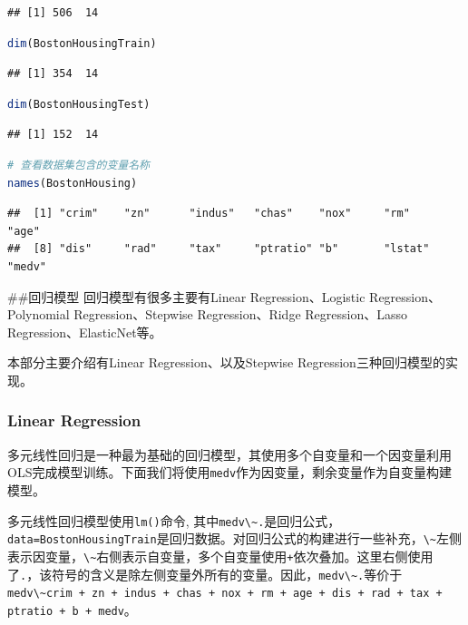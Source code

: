 \documentclass[]{ctexbook}
\newcommand{\passthrough}[1]{#1}
\begin{document}
\begin{lstlisting}
## [1] 506  14
\end{lstlisting}

\begin{lstlisting}[language=R]
dim(BostonHousingTrain)
\end{lstlisting}

\begin{lstlisting}
## [1] 354  14
\end{lstlisting}

\begin{lstlisting}[language=R]
dim(BostonHousingTest)
\end{lstlisting}

\begin{lstlisting}
## [1] 152  14
\end{lstlisting}

\begin{lstlisting}[language=R]
# 查看数据集包含的变量名称
names(BostonHousing)
\end{lstlisting}

\begin{lstlisting}
##  [1] "crim"    "zn"      "indus"   "chas"    "nox"     "rm"      "age"    
##  [8] "dis"     "rad"     "tax"     "ptratio" "b"       "lstat"   "medv"
\end{lstlisting}

\#\#回归模型
回归模型有很多主要有Linear Regression、Logistic Regression、Polynomial Regression、Stepwise Regression、Ridge Regression、Lasso Regression、ElasticNet等。

本部分主要介绍有Linear Regression、以及Stepwise Regression三种回归模型的实现。

\hypertarget{linear-regression}{%
\subsubsection{Linear Regression}\label{linear-regression}}

多元线性回归是一种最为基础的回归模型，其使用多个自变量和一个因变量利用OLS完成模型训练。下面我们将使用\passthrough{\lstinline!medv!}作为因变量，剩余变量作为自变量构建模型。

多元线性回归模型使用\passthrough{\lstinline!lm()!}命令, 其中\passthrough{\lstinline!medv\~.!}是回归公式，\passthrough{\lstinline!data=BostonHousingTrain!}是回归数据。对回归公式的构建进行一些补充，\passthrough{\lstinline!\~!}左侧表示因变量，\passthrough{\lstinline!\~!}右侧表示自变量，多个自变量使用\passthrough{\lstinline!+!}依次叠加。这里右侧使用了\passthrough{\lstinline!.!}，该符号的含义是除左侧变量外所有的变量。因此，\passthrough{\lstinline!medv\~.!}等价于\passthrough{\lstinline!medv\~crim + zn + indus + chas + nox + rm + age + dis + rad + tax + ptratio + b + medv!}。
\end{document}
